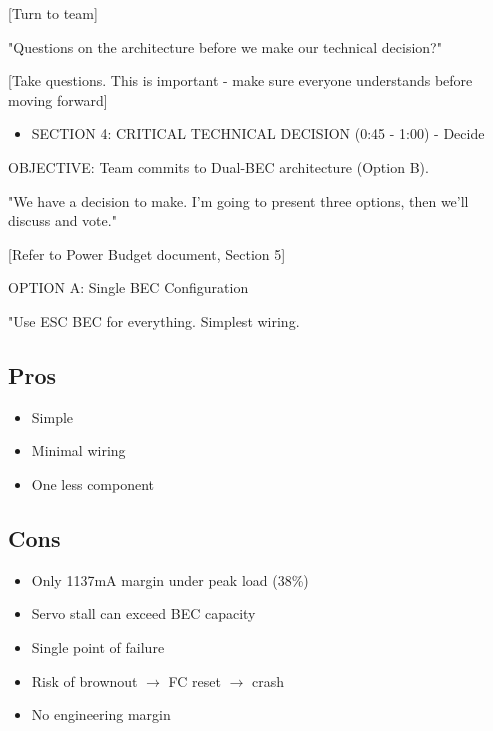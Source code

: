 \documentclass[11pt,letterpaper]{article}
\begin{document}
{[Turn to team]\par

"Questions on the architecture before we make our technical decision?"\par

[Take questions. This is important - make sure everyone understands before moving forward]\par

\begin{itemize}
  \item SECTION 4: CRITICAL TECHNICAL DECISION (0:45 - 1:00) - Decide
\end{itemize}

OBJECTIVE: Team commits to Dual-BEC architecture (Option B).\par

"We have a decision to make. I'm going to present three options, then we'll discuss and vote."\par

[Refer to Power Budget document, Section 5]\par

OPTION A: Single BEC Configuration\par

"Use ESC BEC for everything. Simplest wiring.\par

\subsection{Pros}

\begin{itemize}
  \item Simple
  \item Minimal wiring
  \item One less component
\end{itemize}

\subsection{Cons}

\begin{itemize}
  \item Only 1137mA margin under peak load (38\%)
  \item Servo stall can exceed BEC capacity
  \item Single point of failure
  \item Risk of brownout $\rightarrow$ FC reset $\rightarrow$ crash
  \item No engineering margin
\end{itemize}

}
\end{document}
